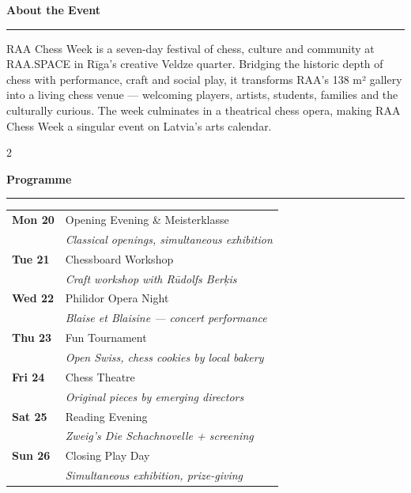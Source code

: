 \documentclass[a4paper,10pt]{article}
\newcommand{\sectionrule}[1]{%
  \vspace{2pt}%
  {\color{raared}\bfseries\large #1}\\[-2pt]%
  {\color{raared}\rule{\linewidth}{0.8pt}}%
  \vspace{2pt}%
}
\begin{document}
\begin{center}
\begin{minipage}{0.90\paperwidth}

\vspace{0.2cm}

\sectionrule{About the Event}

RAA Chess Week is a seven-day festival of chess, culture and community at RAA.SPACE in Rīga's creative Veldze quarter. Bridging the historic depth of chess with performance, craft and social play, it transforms RAA's 138 m² gallery into a living chess venue — welcoming players, artists, students, families and the culturally curious. The week culminates in a theatrical chess opera, making RAA Chess Week a singular event on Latvia's arts calendar.

\vspace{0.1cm}

\begin{multicols}{2}

\sectionrule{Programme}

{\footnotesize
\begin{tabular}{@{}ll@{}}
\textbf{Mon 20} & Opening Evening \& Meisterklasse \\
                & \textit{Classical openings, simultaneous exhibition} \\[1pt]
\textbf{Tue 21} & Chessboard Workshop \\
                & \textit{Craft workshop with Rūdolfs Berķis} \\[1pt]
\textbf{Wed 22} & Philidor Opera Night \\
                & \textit{Blaise et Blaisine — concert performance} \\[1pt]
\textbf{Thu 23} & Fun Tournament \\
                & \textit{Open Swiss, chess cookies by local bakery} \\[1pt]
\textbf{Fri 24} & Chess Theatre \\
                & \textit{Original pieces by emerging directors} \\[1pt]
\textbf{Sat 25} & Reading Evening \\
                & \textit{Zweig's \textup{Die Schachnovelle} + screening} \\[1pt]
\textbf{Sun 26} & Closing Play Day \\
                & \textit{Simultaneous exhibition, prize-giving}\\
\end{tabular}
}


\end{multicols}
\end{minipage}
\end{center}
\end{document}

